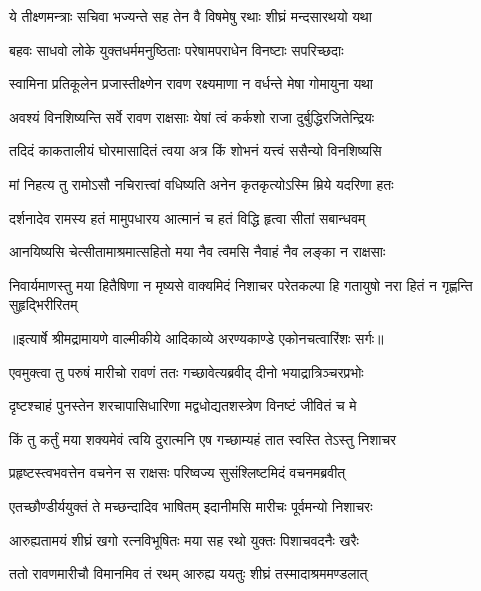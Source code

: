 \twolineshloka
{ये तीक्ष्णमन्त्राः सचिवा भज्यन्ते सह तेन वै}
{विषमेषु रथाः शीघ्रं मन्दसारथयो यथा} %

\twolineshloka
{बहवः साधवो लोके युक्तधर्ममनुष्ठिताः}
{परेषामपराधेन विनष्टाः सपरिच्छदाः} %

\twolineshloka
{स्वामिना प्रतिकूलेन प्रजास्तीक्ष्णेन रावण}
{रक्ष्यमाणा न वर्धन्ते मेषा गोमायुना यथा} %

\twolineshloka
{अवश्यं विनशिष्यन्ति सर्वे रावण राक्षसाः}
{येषां त्वं कर्कशो राजा दुर्बुद्धिरजितेन्द्रियः} %

\twolineshloka
{तदिदं काकतालीयं घोरमासादितं त्वया}
{अत्र किं शोभनं यत्त्वं ससैन्यो विनशिष्यसि} %

\twolineshloka
{मां निहत्य तु रामोऽसौ नचिरात्त्वां वधिष्यति}
{अनेन कृतकृत्योऽस्मि म्रिये यदरिणा हतः} %

\twolineshloka
{दर्शनादेव रामस्य हतं मामुपधारय}
{आत्मानं च हतं विद्धि हृत्वा सीतां सबान्धवम्} %

\twolineshloka
{आनयिष्यसि चेत्सीतामाश्रमात्सहितो मया}
{नैव त्वमसि नैवाहं नैव लङ्का न राक्षसाः} %

\fourlineindentedshloka
{निवार्यमाणस्तु मया हितैषिणा}
{न मृष्यसे वाक्यमिदं निशाचर}
{परेतकल्पा हि गतायुषो नरा}
{हितं न गृह्णन्ति सुहृद्भिरीरितम्} %


{॥इत्यार्षे श्रीमद्रामायणे वाल्मीकीये आदिकाव्ये अरण्यकाण्डे एकोनचत्वारिंशः सर्गः॥}


\twolineshloka
{एवमुक्त्वा तु परुषं मारीचो रावणं ततः}
{गच्छावेत्यब्रवीद् दीनो भयाद्रात्रिञ्चरप्रभोः} %

\twolineshloka
{दृष्टश्चाहं पुनस्तेन शरचापासिधारिणा}
{मद्वधोद्यतशस्त्रेण विनष्टं जीवितं च मे} %

\twolineshloka
{किं तु कर्तुं मया शक्यमेवं त्वयि दुरात्मनि}
{एष गच्छाम्यहं तात स्वस्ति तेऽस्तु निशाचर} %

\twolineshloka
{प्रहृष्टस्त्वभवत्तेन वचनेन स राक्षसः}
{परिष्वज्य सुसंश्लिष्टमिदं वचनमब्रवीत्} %

\twolineshloka
{एतच्छौण्डीर्ययुक्तं ते मच्छन्दादिव भाषितम्}
{इदानीमसि मारीचः पूर्वमन्यो निशाचरः} %

\twolineshloka
{आरुह्यतामयं शीघ्रं खगो रत्नविभूषितः}
{मया सह रथो युक्तः पिशाचवदनैः खरैः} %

\twolineshloka
{ततो रावणमारीचौ विमानमिव तं रथम्}
{आरुह्य ययतुः शीघ्रं तस्मादाश्रममण्डलात्} %

